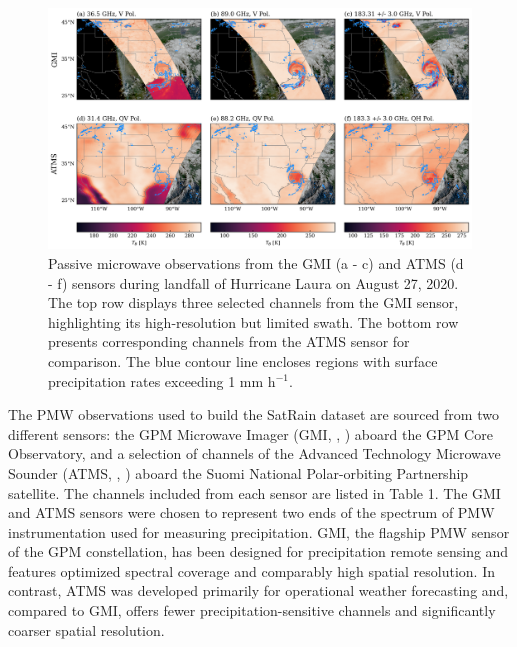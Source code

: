 \documentclass[11pt]{article}
\begin{document}
\begin{figure}[htbp] %
	\centering
	\includegraphics[width=1.0\textwidth]{figures/fig02}
	\caption{
		Passive microwave observations from the GMI (a - c) and ATMS (d - f)
		sensors during landfall of Hurricane Laura on August 27, 2020. The top
		row displays three selected channels from the GMI sensor, highlighting
		its high-resolution but limited swath. The bottom row presents
		corresponding channels from the ATMS sensor for comparison. The blue
		contour line encloses regions with surface precipitation rates exceeding
		1 mm h$^{-1}$.
	}
	\label{fig:observations_pmw}
\end{figure}

The PMW observations used to build the SatRain dataset are sourced from two
different sensors: the GPM Microwave Imager (GMI, \citeauthor{Draper2015GMI},
\citeyear{Draper2015GMI}) aboard the GPM Core Observatory, and a selection of
channels of the Advanced Technology Microwave Sounder (ATMS,
\citeauthor{Goldberg2006ATMS}, \citeyear{Goldberg2006ATMS}) aboard the Suomi
National Polar-orbiting Partnership satellite. The channels included from each
sensor are listed in Table 1. The GMI and ATMS sensors were chosen to represent
two ends of the spectrum of PMW instrumentation used for measuring
precipitation. GMI, the flagship PMW sensor of the GPM constellation, has been
designed for precipitation remote sensing and features optimized spectral
coverage and comparably high spatial resolution. In contrast, ATMS was developed
primarily for operational weather forecasting and, compared to GMI, offers fewer
precipitation-sensitive channels and significantly coarser spatial resolution.
\end{document}
